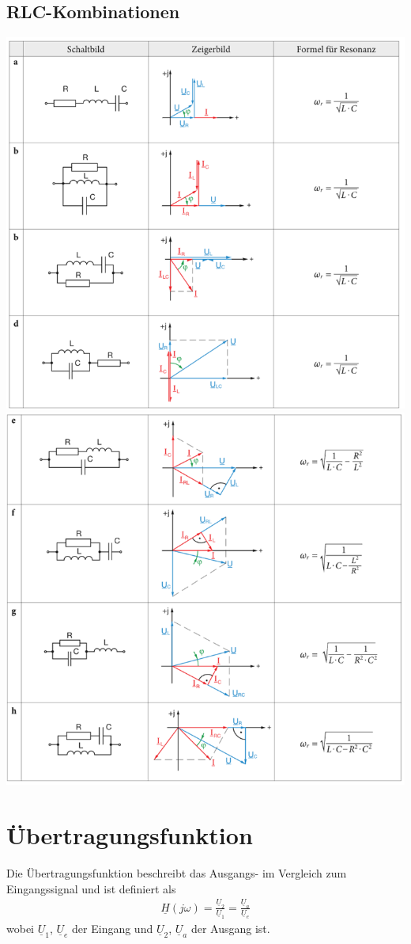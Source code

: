 \subsection{RLC-Kombinationen}
\begin{center}
\includegraphics[width=.75\linewidth]{LineareBauteile/RLC-1.png}
\vspace{0.5cm} \\
\includegraphics[width=.75\linewidth]{LineareBauteile/RLC-2.png}
\end{center}

\newpage

\section{Übertragungsfunktion}
Die Übertragungsfunktion beschreibt das Ausgangs- im Vergleich zum
Eingangssignal und ist definiert als
\begin{align}
    \underline{H}(j\omega)=\frac{\underline{U}_2}{\underline{U}_1}=\frac{\underline{U}_a}{\underline{U}_e}
\end{align}
wobei $\underline{U}_1$, $\underline{U}_e$ der Eingang und $\underline{U}_2$, $\underline{U}_a$ der Ausgang ist.

